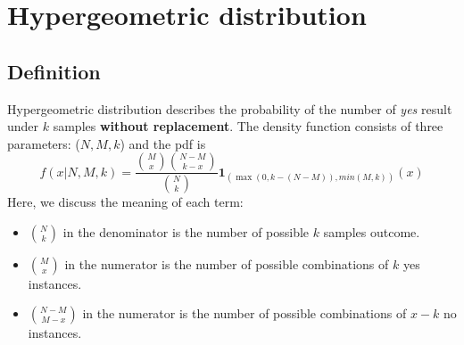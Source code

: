 \documentclass[../Distributions.tex]{subfiles}
\begin{document}
\section{Hypergeometric distribution}
\subsection{Definition}
Hypergeometric distribution describes the probability of the number of {\it yes} result under $k$ samples {\bf without replacement}. The density function consists of three parameters: ($N,M,k$) and the pdf is
$$f(x|N,M,k) = \frac{{M\choose x}{N-M \choose k-x}}{{N\choose k}}\mathbf{1}_{(\max(0,k-(N-M)),min(M,k))}(x)$$
Here, we discuss the meaning of each term:
\begin{itemize}
	\item ${N\choose k}$ in the denominator is the number of possible $k$ samples outcome.
	\item ${M\choose x}$ in the numerator is the number of possible combinations of $k$ yes instances.
	\item ${N-M\choose M-x}$ in the numerator is the number of possible combinations of $x-k$ no instances.
\end{itemize}
\end{document}
